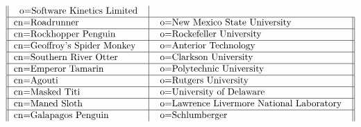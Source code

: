 \begin{table}
\[\begin{tabular}{||l|l||}
\begin{tabular}{l}
           o=Software Kinetics Limited \\
           \end{tabular}\\ \hline
cn=Roadrunner
           &\begin{tabular}{l}
           o=New Mexico State University \\
           \end{tabular}\\ \hline
cn=Rockhopper Penguin
           &\begin{tabular}{l}
           o=Rockefeller University \\
           \end{tabular}\\ \hline
cn=Geoffroy's Spider Monkey
           &\begin{tabular}{l}
           o=Anterior Technology \\
           \end{tabular}\\ \hline
cn=Southern River Otter
           &\begin{tabular}{l}
           o=Clarkson University \\
           \end{tabular}\\ \hline
cn=Emperor Tamarin
           &\begin{tabular}{l}
           o=Polytechnic University \\
	\end{tabular}\\ \hline
cn=Agouti
           &\begin{tabular}{l}
           o=Rutgers University \\
           \end{tabular}\\ \hline
cn=Masked Titi
           &\begin{tabular}{l}
           o=University of Delaware \\
           \end{tabular}\\ \hline
cn=Maned Sloth
           &\begin{tabular}{l}
           o=Lawrence Livermore National Laboratory \\
           \end{tabular}\\ \hline
cn=Galapagos Penguin
           &\begin{tabular}{l}
           o=Schlumberger \\

\end{tabular}
\end{tabular}\]
\end{table}
